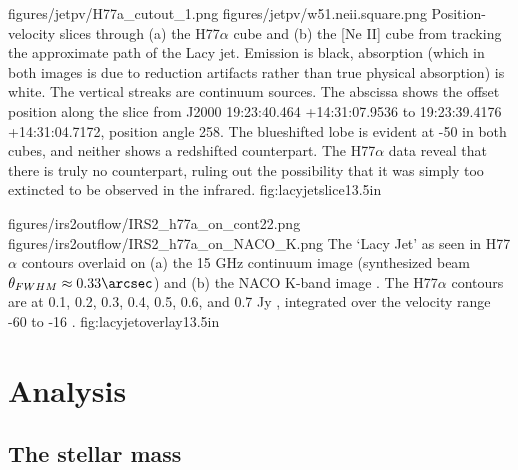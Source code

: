 \FigureTwo
{figures/jetpv/H77a_cutout_1.png}
{figures/jetpv/w51.neii.square.png}
{Position-velocity slices through (a) the H77$\alpha$ cube and (b) the [Ne II]
cube from \citet{Lacy2007a} tracking the approximate path of the Lacy jet.  Emission is black,
absorption (which in both images is due to reduction artifacts rather than true
physical absorption) is white.  The vertical streaks are continuum sources.
The
abscissa shows the offset position along the slice from J2000 19:23:40.464
+14:31:07.9536 to 19:23:39.4176 +14:31:04.7172, position angle 258\arcdeg.
The blueshifted lobe is evident at -50 \kms in both cubes, and neither shows a
redshifted counterpart.  The H77$\alpha$ data reveal that there is truly no
counterpart, ruling out the possibility that it was simply too extincted to be
observed in the infrared.}
{fig:lacyjetslice}{1}{3.5in}


\FigureTwo
{figures/irs2outflow/IRS2_h77a_on_cont22.png} %
{figures/irs2outflow/IRS2_h77a_on_NACO_K.png} %
{The `Lacy Jet' as seen in H77$\alpha$ contours overlaid on (a) the 15 GHz
continuum image (synthesized beam $\theta_{FWHM}\approx0.33\arcsec$) and (b)
the NACO K-band image \citep[resolution $\approx0.2\arcsec$][]{Barbosa2008a}.
The H77$\alpha$ contours are at 0.1, 0.2, 0.3, 0.4, 0.5, 0.6, and 0.7 Jy \kms,
integrated over the velocity range -60 to -16 \kms.}
{fig:lacyjetoverlay}{1}{3.5in}

\section{Analysis}
\label{sec:analysis}
\subsection{The stellar mass}
\label{sec:stellarmass}

